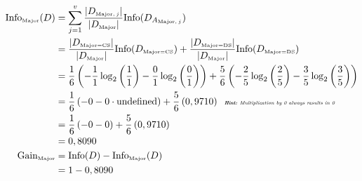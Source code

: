 \documentclass[
english,
smallborders
]{i6prcsht}
\newcommand{\OfSpecificValue}[3]{_{\text{\tiny #1#2#3}}}
\newcommand{\OfAttribute}[1]{_{\text{\tiny #1}}}
\begin{document}
\begin{solution}
\begin{enumerate}
\begin{enumerate}
\begin{enumerate}
				                  \begin{alignat*}{2}
					                  \text{Info}\OfAttribute{Major}(D) & = \sum_{j=1}^v \frac{|D\OfAttribute{Major$,j$}|}{|D\OfAttribute{Major}|} \text{Info}(D_{A\OfAttribute{Major$,j$}})                                                                                                                      \\
					                                                    & = \frac{|D\OfSpecificValue{Major}{=}{CS}|}{|D\OfAttribute{Major}|} \text{Info}(D\OfSpecificValue{Major}{=}{CS}) + \frac{|D\OfSpecificValue{Major}{=}{DS}|}{|D\OfAttribute{Major}|} \text{Info}(D\OfSpecificValue{Major}{=}{DS})         \\
					                                                    & = \frac{1}{6} \left(-\frac{1}{1} \log_2\left(\frac{1}{1}\right) - \frac{0}{1} \log_2\left(\frac{0}{1}\right)\right) + \frac{5}{6} \left(-\frac{2}{5} \log_2\left(\frac{2}{5}\right) - \frac{3}{5} \log_2\left(\frac{3}{5}\right)\right) \\
					                                                    & = \frac{1}{6} \left(- 0 - 0 \cdot \text{undefined}\right) + \frac{5}{6} \left(0,9710\right) \text{\tiny \textit{\hspace{0,2cm}\textbf{Hint:} Multiplication by 0 always results in 0}}                                                  \\
					                                                    & = \frac{1}{6} \left(- 0 - 0 \right) + \frac{5}{6} \left(0,9710\right)                                                                                                                                                                   \\
					                                                    & = 0,8090                                                                                                                                                                                                                                \\
					                  \text{Gain}\OfAttribute{Major}    & = \text{Info}(D) - \text{Info}\OfAttribute{Major}(D)                                                                                                                                                                                    \\
					                                                    & = 1 - 0,8090                                                                                                                                                                                                                            \\

\end{alignat*}
\end{enumerate}
\end{enumerate}
\end{enumerate}
\end{solution}
\end{document}
